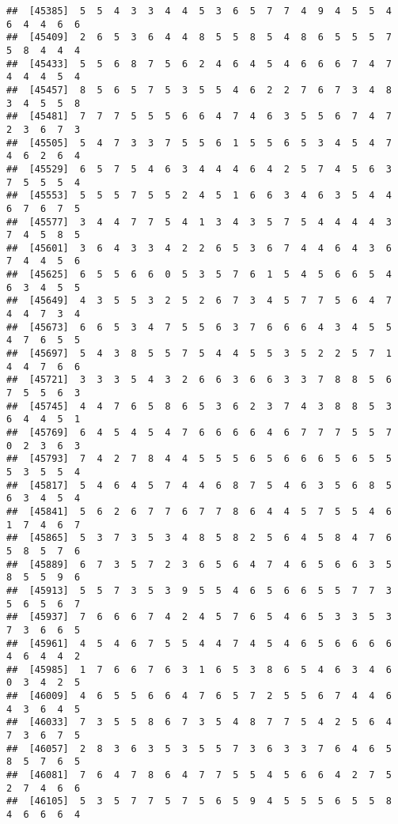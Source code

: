 \documentclass[
]{book}
\begin{document}
\begin{verbatim}
##  [45385]  5  5  4  3  3  4  4  5  3  6  5  7  7  4  9  4  5  5  4  6  4  4  6  6
##  [45409]  2  6  5  3  6  4  4  8  5  5  8  5  4  8  6  5  5  5  7  5  8  4  4  4
##  [45433]  5  5  6  8  7  5  6  2  4  6  4  5  4  6  6  6  7  4  7  4  4  4  5  4
##  [45457]  8  5  6  5  7  5  3  5  5  4  6  2  2  7  6  7  3  4  8  3  4  5  5  8
##  [45481]  7  7  7  5  5  5  6  6  4  7  4  6  3  5  5  6  7  4  7  2  3  6  7  3
##  [45505]  5  4  7  3  3  7  5  5  6  1  5  5  6  5  3  4  5  4  7  4  6  2  6  4
##  [45529]  6  5  7  5  4  6  3  4  4  4  6  4  2  5  7  4  5  6  3  7  5  5  5  4
##  [45553]  5  5  5  7  5  5  2  4  5  1  6  6  3  4  6  3  5  4  4  6  7  6  7  5
##  [45577]  3  4  4  7  7  5  4  1  3  4  3  5  7  5  4  4  4  4  3  7  4  5  8  5
##  [45601]  3  6  4  3  3  4  2  2  6  5  3  6  7  4  4  6  4  3  6  7  4  4  5  6
##  [45625]  6  5  5  6  6  0  5  3  5  7  6  1  5  4  5  6  6  5  4  6  3  4  5  5
##  [45649]  4  3  5  5  3  2  5  2  6  7  3  4  5  7  7  5  6  4  7  4  4  7  3  4
##  [45673]  6  6  5  3  4  7  5  5  6  3  7  6  6  6  4  3  4  5  5  4  7  6  5  5
##  [45697]  5  4  3  8  5  5  7  5  4  4  5  5  3  5  2  2  5  7  1  4  4  7  6  6
##  [45721]  3  3  3  5  4  3  2  6  6  3  6  6  3  3  7  8  8  5  6  7  5  5  6  3
##  [45745]  4  4  7  6  5  8  6  5  3  6  2  3  7  4  3  8  8  5  3  6  4  4  5  1
##  [45769]  6  4  5  4  5  4  7  6  6  6  6  4  6  7  7  7  5  5  7  0  2  3  6  3
##  [45793]  7  4  2  7  8  4  4  5  5  5  6  5  6  6  6  5  6  5  5  5  3  5  5  4
##  [45817]  5  4  6  4  5  7  4  4  6  8  7  5  4  6  3  5  6  8  5  6  3  4  5  4
##  [45841]  5  6  2  6  7  7  6  7  7  8  6  4  4  5  7  5  5  4  6  1  7  4  6  7
##  [45865]  5  3  7  3  5  3  4  8  5  8  2  5  6  4  5  8  4  7  6  5  8  5  7  6
##  [45889]  6  7  3  5  7  2  3  6  5  6  4  7  4  6  5  6  6  3  5  8  5  5  9  6
##  [45913]  5  5  7  3  5  3  9  5  5  4  6  5  6  6  5  5  7  7  3  5  6  5  6  7
##  [45937]  7  6  6  6  7  4  2  4  5  7  6  5  4  6  5  3  3  5  3  7  3  6  6  5
##  [45961]  4  5  4  6  7  5  5  4  4  7  4  5  4  6  5  6  6  6  6  4  6  4  4  2
##  [45985]  1  7  6  6  7  6  3  1  6  5  3  8  6  5  4  6  3  4  6  0  3  4  2  5
##  [46009]  4  6  5  5  6  6  4  7  6  5  7  2  5  5  6  7  4  4  6  4  3  6  4  5
##  [46033]  7  3  5  5  8  6  7  3  5  4  8  7  7  5  4  2  5  6  4  7  3  6  7  5
##  [46057]  2  8  3  6  3  5  3  5  5  7  3  6  3  3  7  6  4  6  5  8  5  7  6  5
##  [46081]  7  6  4  7  8  6  4  7  7  5  5  4  5  6  6  4  2  7  5  2  7  4  6  6
##  [46105]  5  3  5  7  7  5  7  5  6  5  9  4  5  5  5  6  5  5  8  4  6  6  6  4

\end{verbatim}
\end{document}
